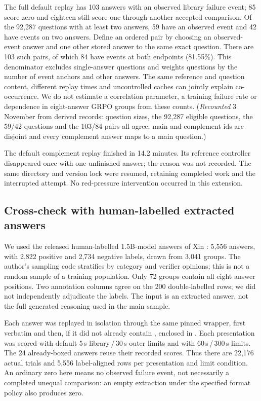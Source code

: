 \documentclass[11pt,a4paper]{article}
\begin{document}
The full default replay has 103 answers with an observed library failure event; 85 score zero and eighteen still score one through another accepted comparison. Of the 92,287 questions with at least two answers, 59 have an observed event and 42 have events on two answers. Define an ordered pair by choosing an observed-event answer and one other stored answer to the same exact question. There are 103 such pairs, of which 84 have events at both endpoints (81.55\%). This denominator excludes single-answer questions and weights questions by the number of event anchors and other answers. The same reference and question content, different replay times and uncontrolled caches can jointly explain co-occurrence. We do not estimate a correlation parameter, a training failure rate or dependence in eight-answer GRPO groups from these counts. (\emph{Recounted} 3 November from derived records: question sizes, the 92,287 eligible questions, the 59/42 questions and the 103/84 pairs all agree; main and complement ids are disjoint and every complement answer maps to a main question.)

The default complement replay finished in 14.2 minutes. Its reference controller disappeared once with one unfinished answer; the reason was not recorded. The same directory and version lock were resumed, retaining completed work and the interrupted attempt. No red-pressure intervention occurred in this extension.

\subsection{Cross-check with human-labelled extracted answers}\label{sec:labels}
We used the released human-labelled 1.5B-model answers of Xin \cite{xinlabels,xingroup}: 5,556 answers, with 2,822 positive and 2,734 negative labels, drawn from 3,041 groups. The author's sampling code stratifies by category and verifier opinions; this is not a random sample of a training population. Only 72 groups contain all eight answer positions. Two annotation columns agree on the 200 double-labelled rows; we did not independently adjudicate the labels. The input is an extracted answer, not the full generated reasoning used in the main sample.

Each answer was replayed in isolation through the same pinned wrapper, first verbatim and then, if it did not already contain \code{\boxed}, enclosed in . Each presentation was scored with default 5\,s library\,/\,30\,s outer limits and with 60\,s\,/\,300\,s limits. The 24 already-boxed answers reuse their recorded scores. Thus there are 22,176 actual trials and 5,556 label-aligned rows per presentation and limit condition. An ordinary zero here means no observed failure event, not necessarily a completed unequal comparison: an empty extraction under the specified format policy also produces zero.
\end{document}
